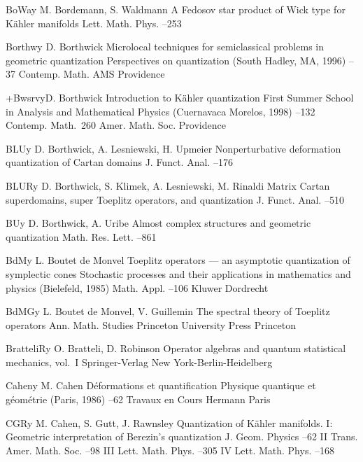 \documentclass[12pt]{amsart}
\numberwithin{equation}{section}
\theoremstyle{remark}
\newcommand{\by}{\mathbf y}
\begin{document}
\begin{thebibliography}{199}
 BoWa\by{ M. Bordemann, S. Waldmann \paper A Fedosov star product of Wick
type for K\"ahler manifolds \jour Lett. Math. Phys.   --253}

 Borthw\by{ D. Borthwick \paper Microlocal techniques for semiclassical
problems in geometric quantization \inbook Perspectives on quantization (South
Hadley, MA, 1996) --37 \bookinfo Contemp. Math.  \publ AMS
\publaddr Providence }

 +Bwsrv\by{D. Borthwick \paper Introduction to K\"ahler quantization
\inbook First Summer School in Analysis and Mathematical Physics (Cuernavaca
Morelos, 1998) --132 \bookinfo Contemp. Math.~260 \publ Amer. Math.
Soc. \publaddr Providence }

 BLU\by{ D. Borthwick, A. Lesniewski, H. Upmeier \paper Nonperturbative
deformation quantization of Cartan domains \jour J. Funct. Anal.   --176}

 BLUR\by{ D. Borthwick, S. Klimek, A. Lesniewski, M. Rinaldi \paper Matrix
Cartan superdomains, super Toeplitz operators, and quantization \jour J. Funct.
Anal.   --510}

 BU\by{ D. Borthwick, A. Uribe \paper Almost complex structures and
geometric quantization \jour Math. Res. Lett.   --861}

 BdM\by{ L. Boutet de Monvel \paper Toeplitz operators --- an asymptotic
quantization of symplectic cones \inbook Stochastic processes and their
applications in mathematics and physics (Bielefeld, 1985) \bookinfo Math. Appl.
 --106 \publ Kluwer \publaddr Dordrecht }

 BdMG\by{ L. Boutet de Monvel, V. Guillemin \book The spectral theory
of Toeplitz operators \bookinfo Ann. Math. Studies  \publ Princeton
University Press \publaddr Princeton }

 BratteliR\by{ O. Bratteli, D. Robinson \book Operator algebras and
quantum statistical mechanics, vol.~I \publ Springer-Verlag \publaddr New
York-Berlin-Heidelberg }

 Cahen\by{ M. Cahen \paper D\'eformations et quantification \inbook
Physique quantique et g\'eom\'etrie (Paris, 1986) --62 \bookinfo
Travaux en Cours  \publ Hermann \publaddr Paris }

 CGR\by{ M. Cahen, S. Gutt, J. Rawnsley \paper Quantization of
K\"ahler manifolds. I: Geometric interpretation of Berezin's quantization
\jour J. Geom. Physics  --62  \moreref \paper II \jour
Trans. Amer. Math. Soc.  --98  \moreref \paper III
\jour Lett. Math. Phys.  --305  \moreref \paper
IV \jour Lett. Math. Phys.   --168}


\end{thebibliography}
\end{document}
